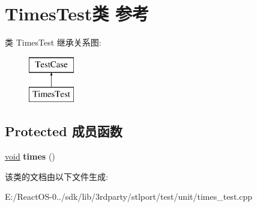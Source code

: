 \hypertarget{class_times_test}{}\section{Times\+Test类 参考}
\label{class_times_test}
类 Times\+Test 继承关系图\+:\begin{figure}[H]
\begin{center}
\leavevmode
\includegraphics[height=2.000000cm]{class_times_test}
\end{center}
\end{figure}
\subsection*{Protected 成员函数}
\begin{DoxyCompactItemize}
\item 
\mbox{\label{class_times_test_a11e28edb10b417092ee2ac447832296c}} 
\hyperlink{interfacevoid}{void} {\bfseries times} ()
\end{DoxyCompactItemize}


该类的文档由以下文件生成\+:\begin{DoxyCompactItemize}
\item 
E\+:/\+React\+O\+S-\/0../sdk/lib/3rdparty/stlport/test/unit/times\+\_\+test.\+cpp\end{DoxyCompactItemize}
